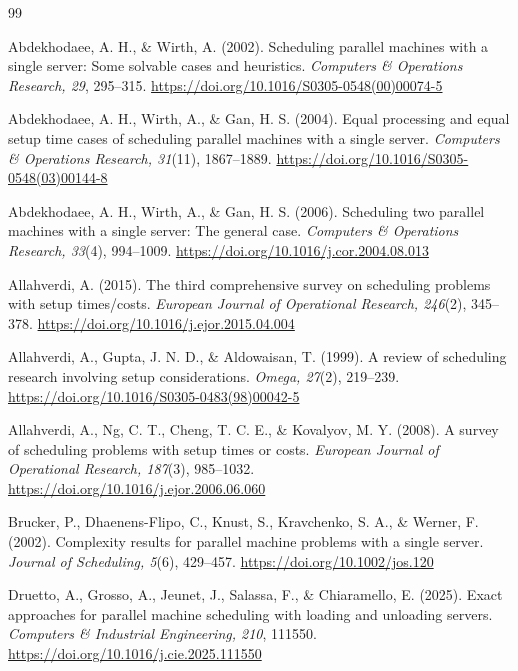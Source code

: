 \documentclass[11pt]{article}
\begin{document}
\begin{thebibliography}{99}

Abdekhodaee, A. H., \& Wirth, A. (2002).
Scheduling parallel machines with a single server: Some solvable cases and heuristics.
\emph{Computers \& Operations Research, 29}, 295--315.
\url{https://doi.org/10.1016/S0305-0548(00)00074-5}

Abdekhodaee, A. H., Wirth, A., \& Gan, H. S. (2004).
Equal processing and equal setup time cases of scheduling parallel machines with a single server.
\emph{Computers \& Operations Research, 31}(11), 1867--1889.
\url{https://doi.org/10.1016/S0305-0548(03)00144-8}

Abdekhodaee, A. H., Wirth, A., \& Gan, H. S. (2006).
Scheduling two parallel machines with a single server: The general case.
\emph{Computers \& Operations Research, 33}(4), 994--1009.
\url{https://doi.org/10.1016/j.cor.2004.08.013}

Allahverdi, A. (2015).
The third comprehensive survey on scheduling problems with setup times/costs.
\emph{European Journal of Operational Research, 246}(2), 345--378.
\url{https://doi.org/10.1016/j.ejor.2015.04.004}

Allahverdi, A., Gupta, J. N. D., \& Aldowaisan, T. (1999).
A review of scheduling research involving setup considerations.
\emph{Omega, 27}(2), 219--239.
\url{https://doi.org/10.1016/S0305-0483(98)00042-5}

Allahverdi, A., Ng, C. T., Cheng, T. C. E., \& Kovalyov, M. Y. (2008).
A survey of scheduling problems with setup times or costs.
\emph{European Journal of Operational Research, 187}(3), 985--1032.
\url{https://doi.org/10.1016/j.ejor.2006.06.060}

Brucker, P., Dhaenens-Flipo, C., Knust, S., Kravchenko, S. A., \& Werner, F. (2002).
Complexity results for parallel machine problems with a single server.
\emph{Journal of Scheduling, 5}(6), 429--457.
\url{https://doi.org/10.1002/jos.120}

Druetto, A., Grosso, A., Jeunet, J., Salassa, F., \& Chiaramello, E. (2025).
Exact approaches for parallel machine scheduling with loading and unloading servers.
\emph{Computers \& Industrial Engineering, 210}, 111550.
\url{https://doi.org/10.1016/j.cie.2025.111550}


\end{thebibliography}
\end{document}
